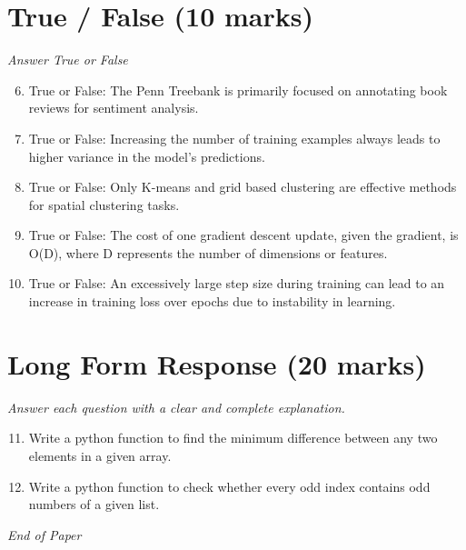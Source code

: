 \documentclass[12pt]{article}
\begin{document}
\section*{True / False (10 marks)}
\textit{Answer True or False}
\begin{enumerate}[label=\arabic*.]
\setcounter{enumi}{5}
\item True or False: The Penn Treebank is primarily focused on annotating book reviews for sentiment analysis.
\item True or False: Increasing the number of training examples always leads to higher variance in the model's predictions.
\item True or False: Only K-means and grid based clustering are effective methods for spatial clustering tasks.
\item True or False: The cost of one gradient descent update, given the gradient, is O(D), where D represents the number of dimensions or features.
\item True or False: An excessively large step size during training can lead to an increase in training loss over epochs due to instability in learning.
\end{enumerate}

\section*{Long Form Response (20 marks)}
\textit{Answer each question with a clear and complete explanation.}
\begin{enumerate}[label=\arabic*.]
\setcounter{enumi}{10}
\item Write a python function to find the minimum difference between any two elements in a given array.
\item Write a python function to check whether every odd index contains odd numbers of a given list.
\end{enumerate}

\vfill
\noindent\textit{End of Paper}
\end{document}
